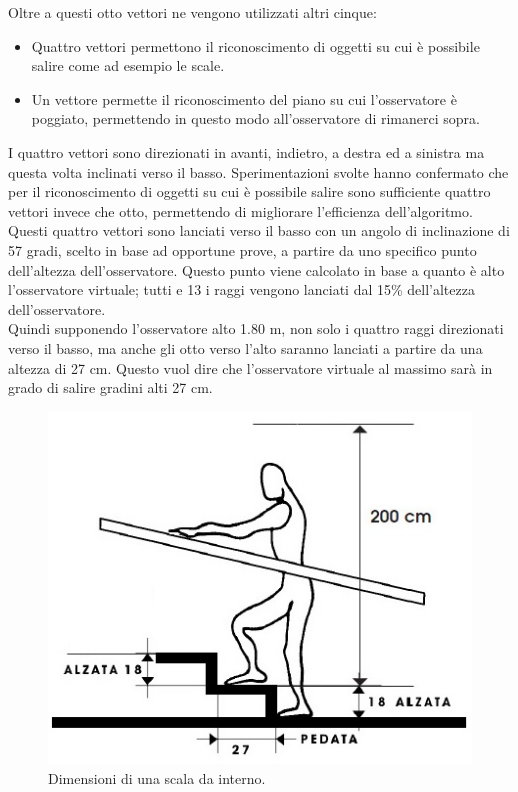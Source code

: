 Oltre a questi otto vettori ne vengono utilizzati altri cinque:
\begin{itemize}
\item Quattro vettori permettono il riconoscimento di oggetti su cui è possibile salire come ad esempio le scale.
\item Un vettore permette il riconoscimento del piano su cui l’osservatore è poggiato, permettendo in questo modo all’osservatore di rimanerci sopra.
\end{itemize}
I quattro vettori sono direzionati in avanti, indietro, a destra ed a sinistra ma questa volta inclinati verso il basso. Sperimentazioni svolte hanno confermato che per il riconoscimento di oggetti su cui è possibile salire sono sufficiente quattro vettori invece che otto, permettendo di migliorare l’efficienza dell’algoritmo.
\\
Questi quattro vettori sono lanciati verso il basso con un angolo di inclinazione di 57 gradi, scelto in base ad opportune prove, a partire da uno specifico punto dell’altezza dell’osservatore. Questo punto viene calcolato in base a quanto è alto l’osservatore virtuale; tutti e 13 i raggi vengono lanciati dal 15\% dell’altezza dell’osservatore.
\\
Quindi supponendo l’osservatore alto 1.80 m, non solo i quattro raggi direzionati verso il basso, ma anche gli otto verso l’alto saranno lanciati a partire da una altezza di 27 cm.
Questo vuol dire che l’osservatore virtuale al massimo sarà in grado di salire gradini alti 27 cm.
\begin{figure}[htb]
 \centering
 \includegraphics[width=0.7\linewidth]{images/chapter_navigazione_scena/scala.jpg}\hfill
 \caption[Dimensioni di una scala da interno.]{Dimensioni di una scala da interno.}
 \label{fig:navigazione_scena_collision_scala}
\end{figure}
